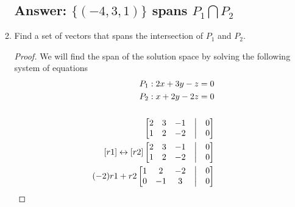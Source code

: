 \documentclass[12pt]{article}
\begin{document}
\begin{enumerate}
\begin{enumerate}
                            \subsection{Answer: $\{(-4, 3, 1)\}$ spans $P_1 \bigcap P_2$}
                      \item Find a set of vectors that spans the intersection of $P_1$ and $P_2$.
                            \begin{proof}
                                    We will find the span of the solution space by solving the following system of equations
                                    \begin{align*}
                                            P_{1}: 2x+3y-z = 0         \\
                                            P_{2}: x+2y-2z = 0         \\\\
                                            \begin{bmatrix}
                                                    2 & 3 & -1 & \bigm| & 0 \\
                                                    1 & 2 & -2 & \bigm| & 0 \\
                                            \end{bmatrix}
                                            \\
                                            [r1] \leftrightarrow  [r2]
                                            \begin{bmatrix}
                                                    2 & 3 & -1 & \bigm| & 0 \\
                                                    1 & 2 & -2 & \bigm| & 0 \\
                                            \end{bmatrix}
                                            \\
                                            (-2)r1+r2
                                            \begin{bmatrix}
                                                    1 & 2  & -2 & \bigm| & 0 \\
                                                    0 & -1 & 3  & \bigm| & 0 \\
                                            \end{bmatrix}
                                            \\

\end{align*}
\end{proof}
\end{enumerate}
\end{enumerate}
\end{document}
